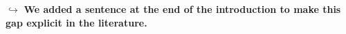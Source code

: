 \documentclass{article}
\begin{document}
$\hookrightarrow$ \textbf{We added a sentence at the end of the introduction to make this gap explicit in the literature.}




\newpage



\end{document}
